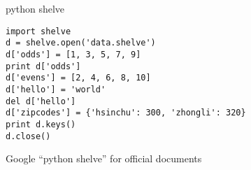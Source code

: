 \documentclass[12pt,c]{beamer}
\begin{document}
\begin{frame}[containsverbatim]{python shelve}
\begin{verbatim}
import shelve
d = shelve.open('data.shelve')
d['odds'] = [1, 3, 5, 7, 9]
print d['odds']
d['evens'] = [2, 4, 6, 8, 10]
d['hello'] = 'world'
del d['hello']
d['zipcodes'] = {'hsinchu': 300, 'zhongli': 320}
print d.keys()
d.close()
\end{verbatim}
Google ``python shelve'' for official documents
\end{frame}  
\end{document}
